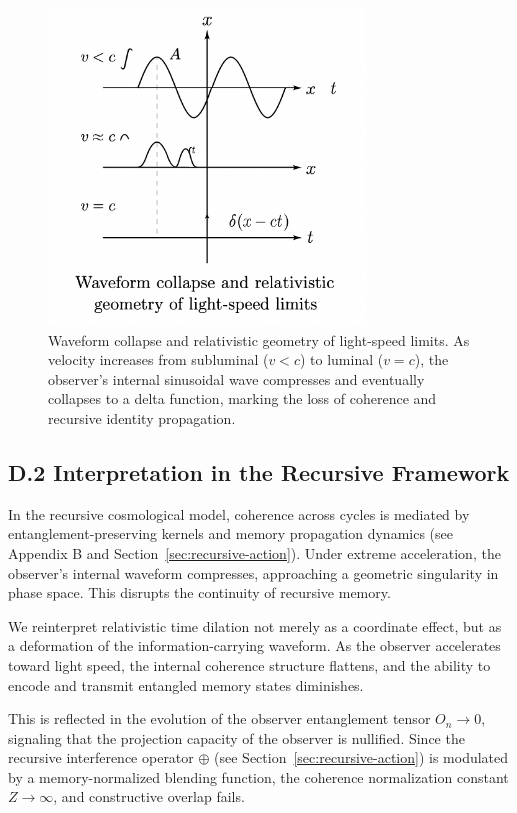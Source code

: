 \begin{figure}[H]
    \centering
    \includegraphics[width=0.75\textwidth]{figures/12D_waveform_collapse_diagram.png}
    \caption{Waveform collapse and relativistic geometry of light-speed limits. As velocity increases from subluminal ($v < c$) to luminal ($v = c$), the observer’s internal sinusoidal wave compresses and eventually collapses to a delta function, marking the loss of coherence and recursive identity propagation.}
    \label{fig:waveform-collapse}
\end{figure}

\subsection*{D.2 Interpretation in the Recursive Framework}

In the recursive cosmological model, coherence across cycles is mediated by entanglement-preserving kernels and memory propagation dynamics (see Appendix B and Section~\ref{sec:recursive-action}). Under extreme acceleration, the observer's internal waveform compresses, approaching a geometric singularity in phase space. This disrupts the continuity of recursive memory.

We reinterpret relativistic time dilation not merely as a coordinate effect, but as a deformation of the information-carrying waveform. As the observer accelerates toward light speed, the internal coherence structure flattens, and the ability to encode and transmit entangled memory states diminishes.

This is reflected in the evolution of the observer entanglement tensor \( O_n \to 0 \), signaling that the projection capacity of the observer is nullified. Since the recursive interference operator \( \oplus \) (see Section~\ref{sec:recursive-action}) is modulated by a memory-normalized blending function, the coherence normalization constant \( Z \to \infty \), and constructive overlap fails.


